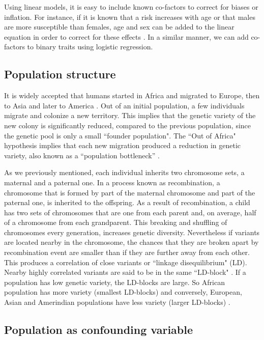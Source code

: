 Using linear models, it is easy to include known co-factors to correct for biases or inflation. For instance, if it is known that a risk increases with age or that males are more susceptible than females, age and sex can be added to the linear equation in order to correct for these effects \cite{balding2006tutorial,clarke2011basic}. In a similar manner, we can add co-factors to binary traits using logistic regression.

\subsection{Population structure \label{sec:popStruct}}

It is widely accepted that humans started in Africa and migrated to Europe, then to Asia and later to America \cite{hartl1997principles}. Out of an initial population, a few individuals migrate and colonize a new territory. This implies that the genetic variety of the new colony is significantly reduced, compared to the previous population, since the genetic pool is only a small ``founder population". The ``Out of Africa" hypothesis implies that each new migration produced a reduction in genetic variety, also known as a ``population bottleneck'' \cite{hartl1997principles}.

As we previously mentioned, each individual inherits two chromosome sets, a maternal and a paternal one. In a process known as recombination, a chromosome that is formed by part of the maternal chromosome and part of the paternal one, is inherited to the offspring. As a result of recombination, a child has two sets of chromosomes that are one from each parent and, on average, half of a chromosome from each grandparent. This breaking and shuffling of chromosomes every generation, increases genetic diversity. Nevertheless if variants are located nearby in the chromosome, the chances that they are broken apart by recombination event are smaller than if they are further away from each other. This produces a correlation of close variants or ``linkage disequilibrium" (LD). Nearby highly correlated variants are said to be in the same ``LD-block" \cite{hartl1997principles}. If a population has low genetic variety, the LD-blocks are large. So African population has more variety (smallest LD-blocks) and conversely, European, Asian and Amerindian populations have less variety (larger LD-blocks) \cite{hartl1997principles}.

\subsection{Population as confounding variable }

